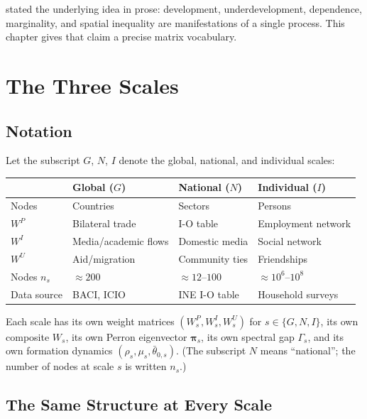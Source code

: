 \documentclass[../structural_economics_book.tex]{subfiles}
\begin{document}
\citet{sunkel1970subdesarrollo} stated the underlying idea in prose: development, underdevelopment, dependence, marginality, and spatial inequality are manifestations of a single process. This chapter gives that claim a precise matrix vocabulary.


\section{The Three Scales}
\label{ch19:sec:three_scales}

\subsection{Notation}

Let the subscript $G$, $N$, $I$ denote the global, national, and individual scales:

\begin{center}
\begin{tabular}{llll}
\toprule
& \textbf{Global} ($G$) & \textbf{National} ($N$) & \textbf{Individual} ($I$) \\
\midrule
Nodes & Countries & Sectors & Persons \\
$W^P$ & Bilateral trade & I-O table & Employment network \\
$W^I$ & Media/academic flows & Domestic media & Social network \\
$W^U$ & Aid/migration & Community ties & Friendships \\
Nodes $n_s$ & $\approx 200$ & $\approx 12$--$100$ & $\approx 10^6$--$10^8$ \\
Data source & BACI, ICIO & INE I-O table & Household surveys \\
\bottomrule
\end{tabular}
\end{center}

Each scale has its own weight matrices $(W^P_s, W^I_s, W^U_s)$ for $s \in \{G, N, I\}$, its own composite $W_s$, its own Perron eigenvector $\boldsymbol{\pi}_s$, its own spectral gap $\Gamma_s$, and its own formation dynamics $(\rho_s, \mu_s, \bar{\theta}_{0,s})$. (The subscript $N$ means ``national''; the number of nodes at scale $s$ is written $n_s$.)


\subsection{The Same Structure at Every Scale}
\end{document}
